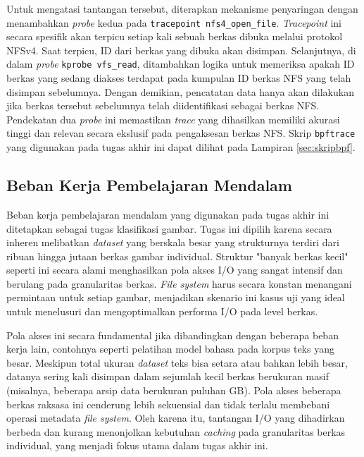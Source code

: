 Untuk mengatasi tantangan tersebut, diterapkan mekanisme penyaringan dengan menambahkan \textit{probe} kedua pada \texttt{tracepoint nfs4\_open\_file}. \textit{Tracepoint} ini secara spesifik akan terpicu setiap kali sebuah berkas dibuka melalui protokol NFSv4. Saat terpicu, ID dari berkas yang dibuka akan disimpan. Selanjutnya, di dalam \textit{probe} \texttt{kprobe vfs\_read}, ditambahkan logika untuk memeriksa apakah ID berkas yang sedang diakses terdapat pada kumpulan ID berkas NFS yang telah disimpan sebelumnya. Dengan demikian, pencatatan data hanya akan dilakukan jika berkas tersebut sebelumnya telah diidentifikasi sebagai berkas NFS. Pendekatan dua \textit{probe} ini memastikan \textit{trace} yang dihasilkan memiliki akurasi tinggi dan relevan secara ekslusif pada pengaksesan berkas NFS. Skrip \texttt{bpftrace} yang digunakan pada tugas akhir ini dapat dilihat pada Lampiran \ref{sec:skripbpf}.

\subsection{Beban Kerja Pembelajaran Mendalam}
\label{sec:bebankerja}

Beban kerja pembelajaran mendalam yang digunakan pada tugas akhir ini ditetapkan sebagai tugas klasifikasi gambar. Tugas ini dipilih karena secara inheren melibatkan \textit{dataset} yang berskala besar yang strukturnya terdiri dari ribuan hingga jutaan berkas gambar individual. Struktur "banyak berkas kecil" seperti ini secara alami menghasilkan pola akses I/O yang sangat intensif dan berulang pada granularitas berkas. \textit{File system} harus secara konstan menangani permintaan untuk setiap gambar, menjadikan skenario ini kasus uji yang ideal untuk menelusuri dan mengoptimalkan performa I/O pada level berkas.

Pola akses ini secara fundamental jika dibandingkan dengan beberapa beban kerja lain, contohnya seperti pelatihan model bahasa pada korpus teks yang besar. Meskipun total ukuran \textit{dataset} teks bisa setara atau bahkan lebih besar, datanya sering kali disimpan dalam sejumlah kecil berkas berukuran masif (misalnya, beberapa arsip data berukuran puluhan GB). Pola akses beberapa berkas raksasa ini cenderung lebih sekuensial dan tidak terlalu membebani operasi metadata \textit{file system}. Oleh karena itu, tantangan I/O yang dihadirkan berbeda dan kurang menonjolkan kebutuhan \textit{caching} pada granularitas berkas individual, yang menjadi fokus utama dalam tugas akhir ini.

